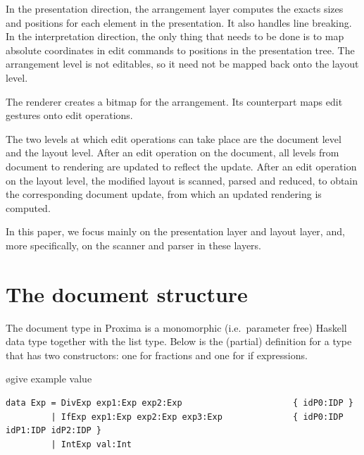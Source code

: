 \documentclass[12pt]{article}
\begin{document}
\noindent In the presentation direction, the arrangement layer computes the exacts sizes and positions for each element in the presentation. It also handles line breaking. In the interpretation direction, the only thing that needs to be done is to map absolute coordinates in edit commands to positions in the presentation tree. The arrangement level is not editables, so it need not be mapped back onto the layout level.

\noindent The renderer creates a bitmap for the arrangement. Its counterpart maps edit gestures onto edit operations.


The two levels at which edit operations can take place are the document level and the layout level. After an edit operation on the document, all levels from document to rendering are updated to reflect the update. After an edit operation on the layout level, the modified layout is scanned, parsed and reduced, to obtain the corresponding document update, from which an updated rendering is computed. 

In this paper, we focus mainly on the presentation layer and layout layer, and, more specifically, on the scanner and parser in these layers.


%
\section{The document structure}\label{sect:document}
%

The document type in Proxima is a monomorphic (i.e.\ parameter free) Haskell data type together with the list type. Below is the (partial) definition for a type  that has two constructors: one for fractions and one for if expressions.

\bl
\o give example value
\el

\begin{footnotesize}
\begin{verbatim}
data Exp = DivExp exp1:Exp exp2:Exp                      { idP0:IDP }
         | IfExp exp1:Exp exp2:Exp exp3:Exp              { idP0:IDP idP1:IDP idP2:IDP }
         | IntExp val:Int
\end{verbatim}
\end{footnotesize}
\end{document}
